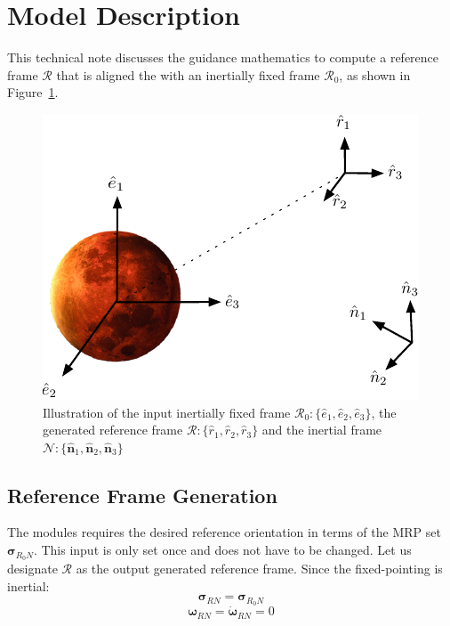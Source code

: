 

\section{Model Description}

This technical note discusses the guidance mathematics to compute a reference frame $\mathcal{R}$ that is aligned the with an inertially fixed  frame  $\mathcal{R}_0$, as shown in Figure~\ref{fig:Fig1}.
\begin{figure}[htb!]
	\centerline{
	\includegraphics{Figures/Fig3}
	}
	\caption{Illustration of the input inertially fixed frame $\mathcal{R}_{0}:\{ \hat e_{1}, \hat e_{2}, \hat e_{3} \}$, the generated reference frame $\mathcal{R}: \{ \hat r_{1}, \hat r_{2}, \hat r_{3}\}$ and the inertial frame $\mathcal{N}:\{ \hat{\bm n}_{1}, \hat{\bm n}_{2}, \hat{\bm n}_{3} \}$}
	\label{fig:Fig1}
\end{figure}

\subsection{Reference Frame Generation}
The modules requires the desired reference orientation in terms of the MRP set $\bm{\sigma}_{R_{0}N}$. This input is only set once and does not have to be changed.
Let us designate $\mathcal{R}$ as the output generated reference frame. Since the fixed-pointing is inertial:
\begin{equation}
	\bm{\sigma}_{RN} = \bm{\sigma}_{R_{0}N}
\end{equation}
\begin{equation}
	\bm{\omega}_{RN} = \dot{\bm{\omega}}_{RN} = 0
\end{equation}

